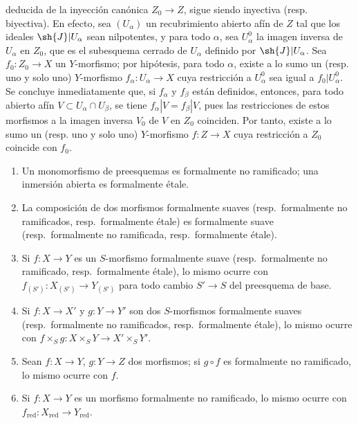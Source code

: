 \begin{remarks}[17.1.2]
\begin{enumerate}
  deducida de la inyección canónica $Z_0\to Z$, sigue siendo inyectiva (resp. biyectiva). En efecto, sea $(U_\alpha)$ un recubrimiento abierto afín de $Z$ tal que los ideales $\sh{J}|U_\alpha$ sean nilpotentes, y para todo $\alpha$, sea $U^0_\alpha$ la imagen inversa de $U_\alpha$ en $Z_0$, que es el subesquema cerrado de $U_\alpha$ definido por $\sh{J}|U_\alpha$. Sea $f_0:Z_0\to X$ un $Y$-morfismo; por hipótesis, para todo $\alpha$, existe a lo sumo un (resp. uno y solo uno) $Y$-morfismo $f_\alpha:U_\alpha\to X$ cuya restricción a $U^0_\alpha$ sea igual a $f_0|U^0_\alpha$. Se concluye inmediatamente que, si $f_\alpha$ y $f_\beta$ están definidos, entonces, para todo abierto afín $V\subset U_\alpha\cap U_\beta$, se tiene $f_\alpha|V=f_\beta|V$, pues las restricciones de estos morfismos a la imagen inversa $V_0$ de $V$ en $Z_0$ coinciden. Por tanto, existe a lo sumo un (resp. uno y solo uno) $Y$-morfismo $f:Z\to X$ cuya restricción a $Z_0$ coincide con $f_0$.
\end{enumerate}
\end{remarks}

\begin{proposition}[17.1.3]
\label{IV.17.1.3}
\begin{enumerate}
  \item[\textup{(i)}] Un monomorfismo de preesquemas es formalmente no ramificado; una inmersión abierta es formalmente étale.
  \item[\textup{(ii)}] La composición de dos morfismos formalmente suaves \textup{(resp.}\ formalmente no ramificados, \textup{resp.}\ formalmente étale\textup{)} es formalmente suave \textup{(resp.}\ formalmente no ramificada, \textup{resp.}\ formalmente étale\textup{)}.
  \item[\textup{(iii)}] Si $f:X\to Y$ es un $S$-morfismo formalmente suave \textup{(resp.}\ formalmente no ramificado, \textup{resp.}\ formalmente étale\textup{)}, lo mismo ocurre con $f_{(S')}:X_{(S')}\to Y_{(S')}$ para todo cambio $S'\to S$ del preesquema de base.
  \item[\textup{(iv)}] Si $f:X\to X'$ y $g:Y\to Y'$ son dos $S$-morfismos formalmente suaves \textup{(resp.}\ formalmente no ramificados, \textup{resp.}\ formalmente étale\textup{)}, lo mismo ocurre con $f\times_S g:X\times_S Y\to X'\times_S Y'$.
  \item[\textup{(v)}] Sean $f:X\to Y$, $g:Y\to Z$ dos morfismos; si $g\circ f$ es formalmente no ramificado, lo mismo ocurre con $f$.
  \item[\textup{(vi)}] Si $f:X\to Y$ es un morfismo formalmente no ramificado, lo mismo ocurre con $f_{\mathrm{red}}:X_{\mathrm{red}}\to Y_{\mathrm{red}}$.
\end{enumerate}
\end{proposition}

